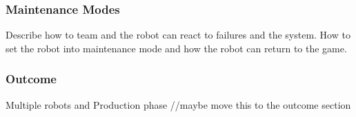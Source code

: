 \subsubsection{Maintenance Modes}

Describe how to team and the robot can react to failures and the system. How to set the robot into maintenance mode and how the robot can return to the game. 


\subsubsection{Outcome}

Multiple robots and Production phase
//maybe move this to the outcome section 






